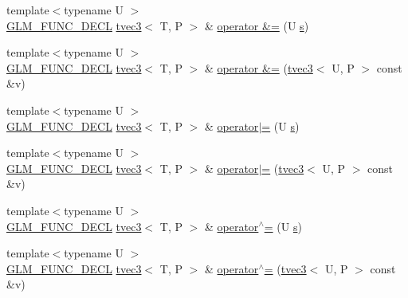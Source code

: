 \begin{DoxyCompactItemize}
{\footnotesize template$<$typename U $>$ }\\\hyperlink{setup_8hpp_ab2d052de21a70539923e9bcbf6e83a51}{G\+L\+M\+\_\+\+F\+U\+N\+C\+\_\+\+D\+E\+CL} \hyperlink{structglm_1_1detail_1_1tvec3}{tvec3}$<$ T, P $>$ \& \hyperlink{structglm_1_1detail_1_1tvec3_a2cdb0f3ff8b3a153b488fedb791934ea}{operator \&=} (U \hyperlink{structglm_1_1detail_1_1tvec3_aa7906d8cd1a54c96ba22c1f97ebaf7cc}{s})
\item 
{\footnotesize template$<$typename U $>$ }\\\hyperlink{setup_8hpp_ab2d052de21a70539923e9bcbf6e83a51}{G\+L\+M\+\_\+\+F\+U\+N\+C\+\_\+\+D\+E\+CL} \hyperlink{structglm_1_1detail_1_1tvec3}{tvec3}$<$ T, P $>$ \& \hyperlink{structglm_1_1detail_1_1tvec3_a2087bf568e50a67761b9371e72d216d8}{operator \&=} (\hyperlink{structglm_1_1detail_1_1tvec3}{tvec3}$<$ U, P $>$ const \&v)
\item 
{\footnotesize template$<$typename U $>$ }\\\hyperlink{setup_8hpp_ab2d052de21a70539923e9bcbf6e83a51}{G\+L\+M\+\_\+\+F\+U\+N\+C\+\_\+\+D\+E\+CL} \hyperlink{structglm_1_1detail_1_1tvec3}{tvec3}$<$ T, P $>$ \& \hyperlink{structglm_1_1detail_1_1tvec3_a818c3ac164bed3ed6eda1842e3d23190}{operator$\vert$=} (U \hyperlink{structglm_1_1detail_1_1tvec3_aa7906d8cd1a54c96ba22c1f97ebaf7cc}{s})
\item 
{\footnotesize template$<$typename U $>$ }\\\hyperlink{setup_8hpp_ab2d052de21a70539923e9bcbf6e83a51}{G\+L\+M\+\_\+\+F\+U\+N\+C\+\_\+\+D\+E\+CL} \hyperlink{structglm_1_1detail_1_1tvec3}{tvec3}$<$ T, P $>$ \& \hyperlink{structglm_1_1detail_1_1tvec3_a605cec2d55f9419c2135027f4cd80a22}{operator$\vert$=} (\hyperlink{structglm_1_1detail_1_1tvec3}{tvec3}$<$ U, P $>$ const \&v)
\item 
{\footnotesize template$<$typename U $>$ }\\\hyperlink{setup_8hpp_ab2d052de21a70539923e9bcbf6e83a51}{G\+L\+M\+\_\+\+F\+U\+N\+C\+\_\+\+D\+E\+CL} \hyperlink{structglm_1_1detail_1_1tvec3}{tvec3}$<$ T, P $>$ \& \hyperlink{structglm_1_1detail_1_1tvec3_a5485429a19dda771abed1aaa2784d999}{operator$^\wedge$=} (U \hyperlink{structglm_1_1detail_1_1tvec3_aa7906d8cd1a54c96ba22c1f97ebaf7cc}{s})
\item 
{\footnotesize template$<$typename U $>$ }\\\hyperlink{setup_8hpp_ab2d052de21a70539923e9bcbf6e83a51}{G\+L\+M\+\_\+\+F\+U\+N\+C\+\_\+\+D\+E\+CL} \hyperlink{structglm_1_1detail_1_1tvec3}{tvec3}$<$ T, P $>$ \& \hyperlink{structglm_1_1detail_1_1tvec3_ad71ff1bf45dbb9470b34b55c9a8cd951}{operator$^\wedge$=} (\hyperlink{structglm_1_1detail_1_1tvec3}{tvec3}$<$ U, P $>$ const \&v)

\end{DoxyCompactItemize}
